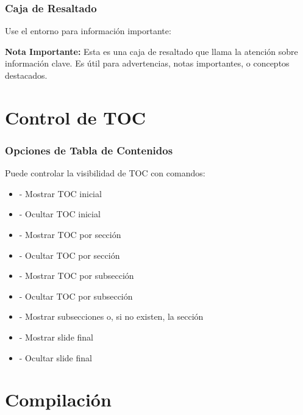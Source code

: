 \documentclass{pt-slides}
\begin{document}
\begin{frame}
    \frametitle{Caja de Resaltado}

    Use el entorno  para información importante:

    \vspace{0.3cm}

    \begin{highlightbox}
        \textbf{Nota Importante:} Esta es una caja de resaltado que llama la atención sobre información clave. Es útil para advertencias, notas importantes, o conceptos destacados.
    \end{highlightbox}
\end{frame}

\section{Control de TOC}

\begin{frame}
    \frametitle{Opciones de Tabla de Contenidos}

    Puede controlar la visibilidad de TOC con comandos:

    \begin{itemize}
        \item {} - Mostrar TOC inicial
        \item {} - Ocultar TOC inicial
        \item {} - Mostrar TOC por sección
        \item {} - Ocultar TOC por sección
        \item {} - Mostrar TOC por subsección
        \item {} - Ocultar TOC por subsección
        \item {} - Mostrar subsecciones o, si no existen, la sección
        \item {} - Mostrar slide final
        \item {} - Ocultar slide final
    \end{itemize}
\end{frame}

\section{Compilación}
\end{document}
